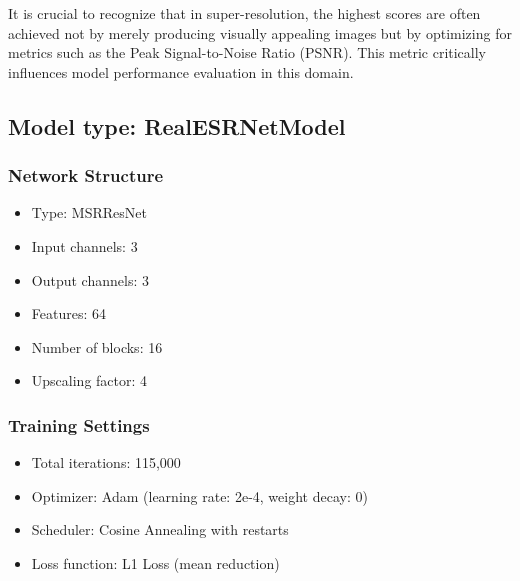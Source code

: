 It is crucial to recognize that in super-resolution, the highest scores are often achieved not by merely producing visually appealing images but by optimizing for metrics such as the Peak Signal-to-Noise Ratio (PSNR). This metric critically influences model performance evaluation in this domain.

\subsection{Model type: RealESRNetModel}
\label{sec:modelImplementation}%

\subsubsection{Network Structure}
\begin{itemize}
    \item Type: MSRResNet
    \item Input channels: 3
    \item Output channels: 3
    \item Features: 64
    \item Number of blocks: 16
    \item Upscaling factor: 4
\end{itemize}

\subsubsection{Training Settings}
\begin{itemize}
    \item Total iterations: 115,000
    \item Optimizer: Adam (learning rate: 2e-4, weight decay: 0)
    \item Scheduler: Cosine Annealing with restarts
    \item Loss function: L1 Loss (mean reduction)
\end{itemize}

